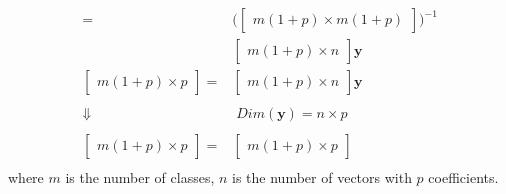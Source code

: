 \begin{equation}
\begin{split}
	= &
	\biggl(\begin{bmatrix}
		m(1+p) \times  m(1+p)
	\end{bmatrix} \biggr)^{-1} \\ &
	\begin{bmatrix}
		m(1+p) \times n 
	\end{bmatrix} \mathbf{y} \\ %
	\begin{bmatrix}
		m (1+p) \times p
	\end{bmatrix}
	= &
	\begin{bmatrix}
		m(1+p) \times n 
	\end{bmatrix} \mathbf{y} \\ %
	& \\
	\Downarrow & \; Dim(\mathbf{y}) = n \times p \\ %
	& \\
	\begin{bmatrix}
		m (1+p) \times p
	\end{bmatrix}
	= &
	\begin{bmatrix}
		m(1+p) \times p 
	\end{bmatrix} \\ %
	\end{split}
\end{equation}
where $m$ is the number of classes, $n$ is the number of vectors with $p$ coefficients.
